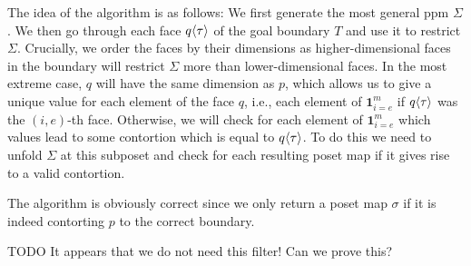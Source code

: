 \documentclass{llncs}
\newcommand{\todo}[1]{
  \begin{tcolorbox}
    TODO {#1} 
  \end{tcolorbox}
}
\newcommand{\mdef}{:=}
\newcommand{\pint}[1]{\mathbf{1}^{#1}}
\newcommand{\pintrestr}[3]{\mathbf{1}^{#1}_{{#2}={#3}}}
\newcommand{\izero}{\mathsf{0}}
\newcommand{\ione}{\mathsf{1}}
\renewcommand{\dim}[1]{\mathsf{dim}({#1})}
\newcommand{\cont}[2]{\ensuremath{ \ifthenelse{\equal{#2}{}}{#1}{{#1}\langle{#2}\rangle}} }
\newcommand{\boundary}[1]{\partial({#1})}
\begin{document}
\begin{proposition}
The idea of the algorithm is as follows: We first generate the most general ppm
$\Sigma$. We then go through each face $\cont{q}{\tau}$ of the goal boundary $T$
and use it to restrict $\Sigma$. Crucially, we order the faces by their
dimensions as higher-dimensional faces in the boundary will restrict $\Sigma$
more than lower-dimensional faces. In the most extreme case, $q$ will have the
same dimension as $p$, which allows us to give a unique value for each element
of the face $q$, i.e., each element of $\pintrestr{m}{i}{e}$ if $\cont{q}{\tau}$ was
the $(i,e)$-th face. Otherwise, we will check for each element of $\pintrestr{m}{i}{e}$ which
values lead to some contortion which is equal to $\cont{q}{\tau}$. To do this we
need to unfold $\Sigma$ at this subposet and check for each resulting poset map
if it gives rise to a valid contortion.

The algorithm is obviously correct since we only return a poset map $\sigma$ if
it is indeed contorting $p$ to the correct boundary.

\todo{It appears that we do not need this filter! Can we prove this?}






\end{proposition}
\end{document}

